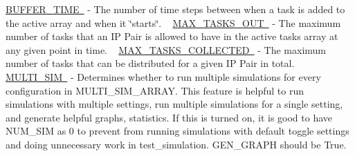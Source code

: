  \mbox{\hyperlink{}{B\+U\+F\+F\+E\+R\+\_\+\+T\+I\+ME }} -\/ The number of time steps between when a task is added to the active array and when it \char`\"{}starts\char`\"{}. ~\newline
 \mbox{\hyperlink{}{M\+A\+X\+\_\+\+T\+A\+S\+K\+S\+\_\+\+O\+UT }} -\/ The maximum number of tasks that an IP Pair is allowed to have in the active tasks array at any given point in time. ~\newline
 \mbox{\hyperlink{}{M\+A\+X\+\_\+\+T\+A\+S\+K\+S\+\_\+\+C\+O\+L\+L\+E\+C\+T\+ED }} -\/ The maximum number of tasks that can be distributed for a given IP Pair in total. ~\newline
 \mbox{\hyperlink{}{M\+U\+L\+T\+I\+\_\+\+S\+IM }} -\/ Determines whether to run multiple simulations for every configuration in M\+U\+L\+T\+I\+\_\+\+S\+I\+M\+\_\+\+A\+R\+R\+AY. This feature is helpful to run simulations with multiple settings, run multiple simulations for a single setting, and generate helpful graphs, statistics. If this is turned on, it is good to have N\+U\+M\+\_\+\+S\+IM as 0 to prevent from running simulations with default toggle settings and doing unnecessary work in test\+\_\+simulation. G\+E\+N\+\_\+\+G\+R\+A\+PH should be True.
